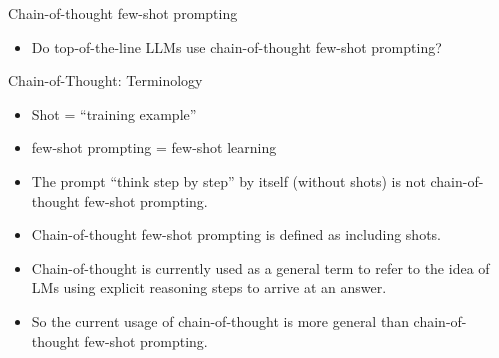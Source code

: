 \documentclass[11pt,compress,t,notes=noshow, xcolor=table]{beamer}
\def\cotpfull{chain-of-thought few-shot prompting\xspace}
\def\cotpfullcap{Chain-of-thought few-shot prompting\xspace}
\begin{document}
\begin{frame}{\cotpfullcap}

\vfill

\begin{itemize}
    \item \ques Do top-of-the-line LLMs use \cotpfull?
\end{itemize}

\vfill

\end{frame}





\begin{frame}{Chain-of-Thought: Terminology}

\vfill

\begin{itemize}
    \item Shot = ``training example''
    \item few-shot prompting = few-shot learning
    \item The prompt ``think step by step'' by itself
    (without shots) is not \cotpfull.
    \item \cotpfullcap is defined as including shots.
    \item Chain-of-thought is currently used as a general
    term to refer to the idea of LMs using explicit
    reasoning steps to arrive at an answer.
    \item So the current usage of chain-of-thought is more
    general than \cotpfull.
\end{itemize}

\vfill


\end{frame}

\end{document}
